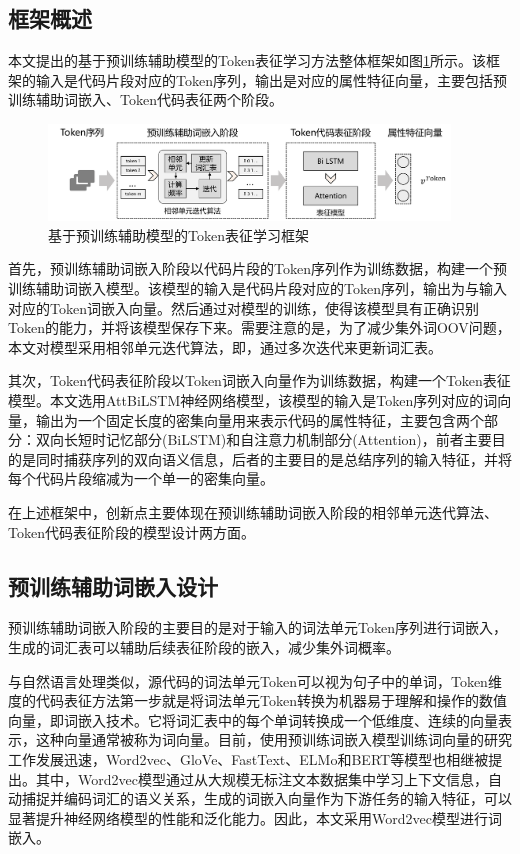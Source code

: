 \subsection{框架概述}
\label{subsec:TokenOverview}
本文提出的基于预训练辅助模型的Token表征学习方法整体框架如图\ref{fig:tokenframework}所示。该框架的输入是代码片段对应的Token序列，输出是对应的属性特征向量，主要包括预训练辅助词嵌入、Token代码表征两个阶段。

\begin{figure}[H]
  \centering
  \includegraphics[width=0.95\textwidth]{figures/tokenframework}
  \caption{基于预训练辅助模型的Token表征学习框架}\label{fig:tokenframework}
\end{figure}

首先，预训练辅助词嵌入阶段以代码片段的Token序列作为训练数据，构建一个预训练辅助词嵌入模型。该模型的输入是代码片段对应的Token序列，输出为与输入对应的Token词嵌入向量。然后通过对模型的训练，使得该模型具有正确识别Token的能力，并将该模型保存下来。需要注意的是，为了减少集外词OOV问题，本文对模型采用相邻单元迭代算法，即，通过多次迭代来更新词汇表。

其次，Token代码表征阶段以Token词嵌入向量作为训练数据，构建一个Token表征模型。本文选用AttBiLSTM神经网络模型，该模型的输入是Token序列对应的词向量，输出为一个固定长度的密集向量用来表示代码的属性特征，主要包含两个部分：双向长短时记忆部分(BiLSTM)和自注意力机制部分(Attention)，前者主要目的是同时捕获序列的双向语义信息，后者的主要目的是总结序列的输入特征，并将每个代码片段缩减为一个单一的密集向量。

在上述框架中，创新点主要体现在预训练辅助词嵌入阶段的相邻单元迭代算法、Token代码表征阶段的模型设计两方面。

\subsection{预训练辅助词嵌入设计}
\label{subsec:TokenPreModel}

预训练辅助词嵌入阶段的主要目的是对于输入的词法单元Token序列进行词嵌入，生成的词汇表可以辅助后续表征阶段的嵌入，减少集外词概率。

与自然语言处理类似，源代码的词法单元Token可以视为句子中的单词，Token维度的代码表征方法第一步就是将词法单元Token转换为机器易于理解和操作的数值向量，即词嵌入技术。它将词汇表中的每个单词转换成一个低维度、连续的向量表示，这种向量通常被称为词向量。目前，使用预训练词嵌入模型训练词向量的研究工作发展迅速，Word2vec、GloVe、FastText、ELMo和BERT等模型也相继被提出。其中，Word2vec模型通过从大规模无标注文本数据集中学习上下文信息，自动捕捉并编码词汇的语义关系，生成的词嵌入向量作为下游任务的输入特征，可以显著提升神经网络模型的性能和泛化能力。因此，本文采用Word2vec模型进行词嵌入。

